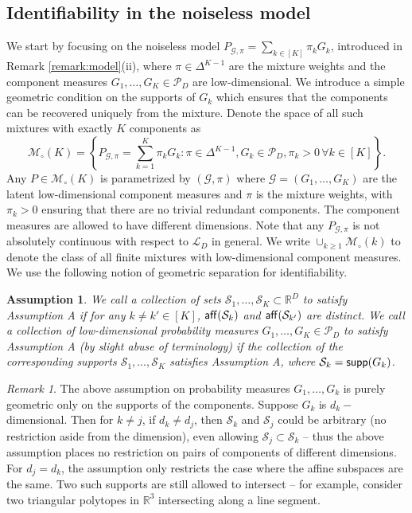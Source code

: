 \documentclass[bj,authoryear]{imsart}
\theoremstyle{plain}
\newtheorem{assumption}{Assumption}
\theoremstyle{remark}
\newtheorem{remark}{Remark}
\def\aff{{\sf aff}}
\def\bbR{\mathbb{R}}
\def\cG{\mathcal{G}}
\def\cL{\mathcal{L}}
\def\cM{\mathcal{M}}
\def\cP{\mathcal{P}}
\def\cS{\mathcal{S}}
\def\supp{{\sf supp}}
\begin{document}
\subsection{Identifiability in the noiseless model}

We start by focusing on the noiseless model $P_{\cG,\pi}=\sum_{k\in[K]} \pi_k G_k$, introduced in Remark \ref{remark:model}(ii), where $\pi\in\Delta^{K-1}$ are the mixture weights and the component measures $G_1,\dots,G_K\in \cP_D$ are low-dimensional. We introduce a simple geometric condition on the supports of $G_k$ which ensures that the components can be recovered uniquely from the mixture. Denote the space of all such mixtures with exactly $K$ components as 
$$\cM_\circ(K)=\left\{P_{\cG,\pi}=\sum_{k=1}^K\pi_k G_k :\pi\in\Delta^{K-1}, G_k\in \cP_D, \pi_k>0\,\forall k\in[K]\right\}.$$
Any $P\in \cM_\circ(K)$ is parametrized by $(\cG,\pi)$ where $\cG=(G_1,\dots,G_K)$ are the latent low-dimensional component measures and $\pi$ is the mixture weights, with $\pi_k>0$ ensuring that there are no trivial redundant components. The component measures are allowed to have different dimensions. Note that any $P_{\cG,\pi}$ is not absolutely continuous with respect to $\cL_D$ in general. We write $\cup_{k\geq 1} \cM_{\circ}(k)$ to denote the class of all finite mixtures with low-dimensional component measures. We use the following notion of geometric separation for identifiability.

\begin{assumption}\label{assume:A}
We call a collection of sets $\cS_1,\dots,\cS_K\subset \bbR^D$ to satisfy Assumption A if for any $k\neq k'\in[K]$, $\aff(\cS_k)$ and $\aff (\cS_{k'})$ are distinct. We call a collection of low-dimensional probability measures $G_1,\dots,G_K\in \cP_D$ to satisfy Assumption A (by slight abuse of terminology) if the collection of the corresponding supports $\cS_1,\dots,\cS_K$ satisfies Assumption A, where $\cS_k=\supp(G_k)$.
\end{assumption}

\begin{remark}
The above assumption on probability measures $G_1,\dots,G_k$ is purely geometric only on the supports of the components. Suppose $G_k$ is $d_k-$dimensional. Then for $k\neq j$, if $d_k\neq d_j$, then $\cS_k$ and $\cS_j$ could be arbitrary (no restriction aside from the dimension), even allowing $\cS_j\subset \cS_k$ -- thus the above assumption places no restriction on pairs of components of different dimensions. For $d_j=d_k$, the assumption only restricts the case where the affine subspaces are the same. Two such supports are still allowed to intersect -- for example, consider two triangular polytopes in $\bbR^3$ intersecting along a line segment.    
\end{remark}
\end{document}
